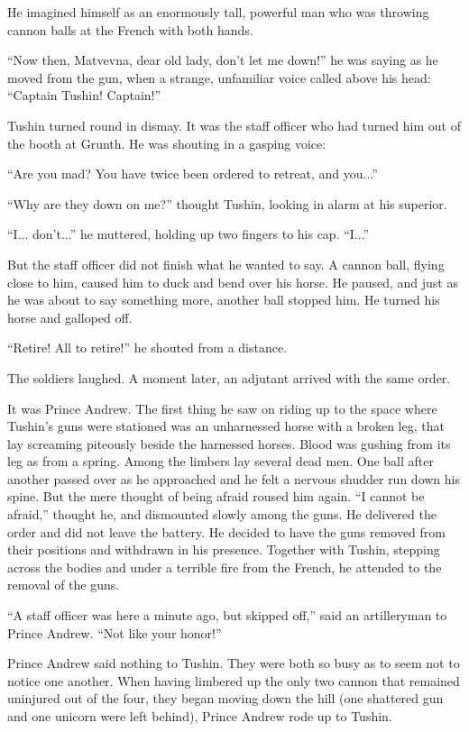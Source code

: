 He imagined himself as an enormously tall, powerful man who was
throwing cannon balls at the French with both hands.

``Now then, Matvevna, dear old lady, don't let me down!'' he was
saying as he moved from the gun, when a strange, unfamiliar voice
called above his head: ``Captain Tushin! Captain!''

Tushin turned round in dismay. It was the staff officer who had
turned him out of the booth at Grunth. He was shouting in a
gasping voice:

``Are you mad? You have twice been ordered to retreat, and
you...''

``Why are they down on me?'' thought Tushin, looking in alarm at
his superior.

``I... don't...'' he muttered, holding up two fingers to his
cap. ``I...''

But the staff officer did not finish what he wanted to say. A
cannon ball, flying close to him, caused him to duck and bend
over his horse.  He paused, and just as he was about to say
something more, another ball stopped him. He turned his horse and
galloped off.

``Retire! All to retire!'' he shouted from a distance.

The soldiers laughed. A moment later, an adjutant arrived with
the same order.

It was Prince Andrew. The first thing he saw on riding up to the
space where Tushin's guns were stationed was an unharnessed horse
with a broken leg, that lay screaming piteously beside the
harnessed horses.  Blood was gushing from its leg as from a
spring. Among the limbers lay several dead men. One ball after
another passed over as he approached and he felt a nervous
shudder run down his spine. But the mere thought of being afraid
roused him again. ``I cannot be afraid,'' thought he, and
dismounted slowly among the guns. He delivered the order and did
not leave the battery. He decided to have the guns removed from
their positions and withdrawn in his presence. Together with
Tushin, stepping across the bodies and under a terrible fire from
the French, he attended to the removal of the guns.

``A staff officer was here a minute ago, but skipped off,'' said
an artilleryman to Prince Andrew. ``Not like your honor!''

Prince Andrew said nothing to Tushin. They were both so busy as
to seem not to notice one another. When having limbered up the
only two cannon that remained uninjured out of the four, they
began moving down the hill (one shattered gun and one unicorn
were left behind), Prince Andrew rode up to Tushin.


